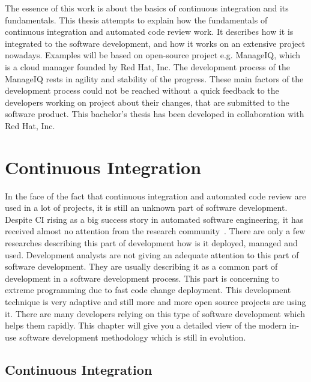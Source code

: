 The essence of this work is about the basics of continuous integration and its fundamentals. This thesis attempts to explain how the fundamentals of continuous integration and automated code review work. It describes how it is integrated to the software development, and how it works on an extensive project nowadays. Examples will be based on open-source project e.g. ManageIQ, which is a cloud manager founded by Red Hat, Inc. The development process of the ManageIQ rests in agility and stability of the progress. These main factors of the development process could not be reached without a quick feedback to the developers working on project about their changes, that are submitted to the software product. This bachelor's thesis has been developed in collaboration with Red Hat, Inc.

\chapter{Continuous Integration}

In the face of the fact that continuous integration and automated code review are used in a lot of projects, it is still an unknown part of software development. Despite CI rising as a big success story in automated software engineering, it has received almost no attention from the research community~\cite{COPE}. There are only a few researches describing this part of development how is it deployed, managed and used. Development analysts are not giving an adequate attention to this part of software development. They are usually describing it as a common part of development in a software development process. This part is concerning to extreme programming due to fast code change deployment. This development technique is very adaptive and still more and more open source projects are using it. There are many developers relying on this type of software development which helps them rapidly. This chapter will give you a detailed view of the modern in-use software development methodology which is still in evolution.

\section{Continuous Integration}


